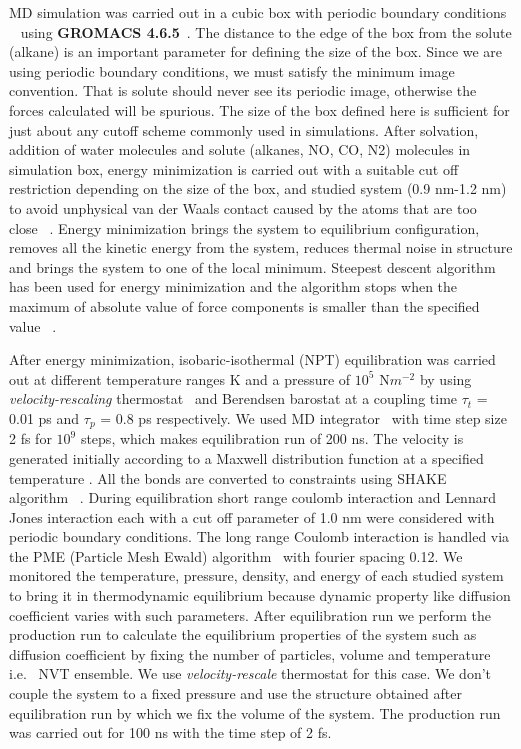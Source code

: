 MD simulation was carried out in a cubic box  with periodic boundary conditions ~ \citep{Allen1989} using \textbf{GROMACS 4.6.5}~\citep{van2005gromacs, hess2008gromacs}. The distance to the edge of the box from the solute (alkane) is an important parameter for defining the size of the box. Since we are  using periodic boundary conditions, we must satisfy the minimum image convention. That is  solute should never see its periodic image, otherwise the forces calculated will be spurious. The size of the box defined here  is sufficient for just about any cutoff scheme commonly used in simulations. After solvation, addition of  water molecules and solute (alkanes, NO, CO, N2) molecules in simulation box, energy minimization is carried out with a suitable cut off restriction depending on the size of the box, and studied system (0.9 nm-1.2 nm) to avoid unphysical van der Waals contact caused by the atoms that are too close~ \citep{Gromacs-manual}. Energy minimization brings the system to equilibrium configuration, removes all the kinetic energy from the system, reduces thermal noise in structure and brings the system to one of the local minimum. Steepest descent algorithm has been used for energy minimization and the algorithm stops when the maximum of absolute value of force components is smaller than the specified value~ \citep{Gromacs-manual}. 

 After energy minimization, isobaric-isothermal (NPT) equilibration was carried out at different temperature ranges  K and a pressure of $10^5$ N$m^{-2}$ by using \emph{velocity-rescaling} thermostat~ \citep{bussi2007canonical} and Berendsen barostat \citep{Berendsen1984}  at a coupling time $\tau_t$ = 0.01 ps and $\tau_p$ = 0.8 ps respectively. We used MD integrator~\citep{hockney1974quiet} with time step size 2 fs for  $10^9$ steps, which makes equilibration run of 200 ns. The velocity is generated initially according to a Maxwell distribution function at a specified temperature \citep{Gromacs-manual}. All the bonds are converted to constraints using SHAKE algorithm~ \citep{ryckaert1977numerical}. During equilibration short range coulomb interaction and Lennard Jones interaction each with a cut off parameter of 1.0 nm were considered  with periodic boundary conditions\citep{Allen1989}. The long range Coulomb interaction is handled via the PME (Particle Mesh Ewald) algorithm~ \citep{darden1993particle, essmann1995smooth} with fourier spacing 0.12. We monitored the temperature, pressure, density, and energy of each studied system to bring it in  thermodynamic equilibrium because dynamic property like diffusion coefficient varies with
such parameters.  After equilibration run we perform the production run to calculate the equilibrium properties of the system such as diffusion
coefficient by fixing the number of particles, volume and temperature i.e.~ NVT ensemble. We use \emph{velocity-rescale} thermostat for this
case. We don't couple the system to a fixed pressure and use the structure obtained after equilibration run by which we fix the volume of the system. The production run was carried out for 100 ns with the time step of 2 fs.

